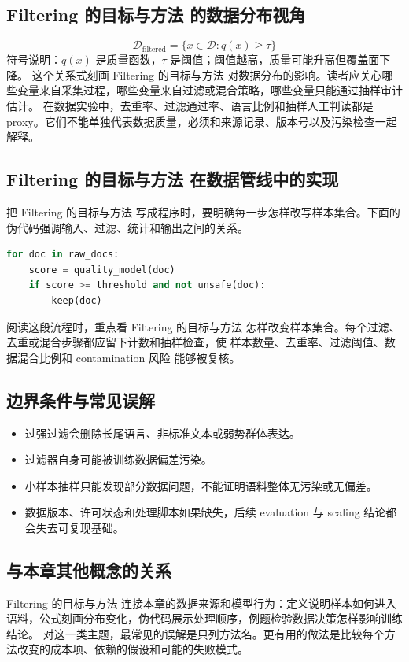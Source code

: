 \documentclass[a4paper]{article}
\begin{document}
\subsection{Filtering 的目标与方法 的数据分布视角}
\[\mathcal{D}_{\text{filtered}}=\{x\in\mathcal{D}: q(x)\ge \tau\}\]
符号说明：\(q(x)\) 是质量函数，\(\tau\) 是阈值；阈值越高，质量可能升高但覆盖面下降。
这个关系式刻画 Filtering 的目标与方法 对数据分布的影响。读者应关心哪些变量来自采集过程，哪些变量来自过滤或混合策略，哪些变量只能通过抽样审计估计。
在数据实验中，去重率、过滤通过率、语言比例和抽样人工判读都是 proxy。它们不能单独代表数据质量，必须和来源记录、版本号以及污染检查一起解释。
\subsection{Filtering 的目标与方法 在数据管线中的实现}
把 Filtering 的目标与方法 写成程序时，要明确每一步怎样改写样本集合。下面的伪代码强调输入、过滤、统计和输出之间的关系。
\begin{lstlisting}[language=Python]
for doc in raw_docs:
    score = quality_model(doc)
    if score >= threshold and not unsafe(doc):
        keep(doc)
\end{lstlisting}
阅读这段流程时，重点看 Filtering 的目标与方法 怎样改变样本集合。每个过滤、去重或混合步骤都应留下计数和抽样检查，使 样本数量、去重率、过滤阈值、数据混合比例和 contamination 风险 能够被复核。
\subsection{边界条件与常见误解}
\begin{itemize}
\item 过强过滤会删除长尾语言、非标准文本或弱势群体表达。
\item 过滤器自身可能被训练数据偏差污染。
\item 小样本抽样只能发现部分数据问题，不能证明语料整体无污染或无偏差。
\item 数据版本、许可状态和处理脚本如果缺失，后续 evaluation 与 scaling 结论都会失去可复现基础。
\end{itemize}
\subsection{与本章其他概念的关系}
Filtering 的目标与方法 连接本章的数据来源和模型行为：定义说明样本如何进入语料，公式刻画分布变化，伪代码展示处理顺序，例题检验数据决策怎样影响训练结论。
对这一类主题，最常见的误解是只列方法名。更有用的做法是比较每个方法改变的成本项、依赖的假设和可能的失败模式。
\end{document}

